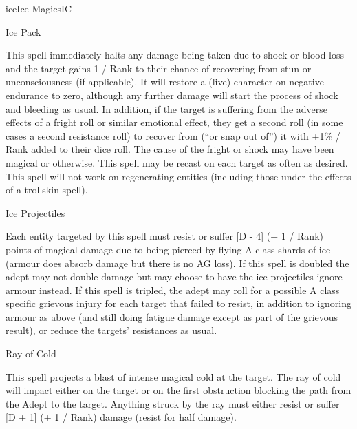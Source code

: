 \begin{college}[1.5]{ice}{Ice Magics}{IC}
\begin{spell}[S-10]{Ice Pack}
\begin{effects}
This spell immediately halts any damage being taken due to shock or
blood loss and the target gains 1 / Rank to their chance of recovering
from stun or unconsciousness (if applicable). It will restore a (live)
character on negative endurance to zero, although any further damage
will start the process of shock and bleeding as usual. In addition, if
the target is suffering from the adverse effects of a fright roll or
similar emotional effect, they get a second roll (in some cases a
second resistance roll) to recover from (``or snap out of'') it with
+1\% / Rank added to their dice roll. The cause of the fright or shock
may have been magical or otherwise. This spell may be recast on each
target as often as desired. This spell will not work on regenerating
entities (including those under the effects of a trollskin spell).
\end{effects}
\end{spell}

\begin{spell}[S-11]{Ice Projectiles}

\begin{effects}
Each entity targeted by this spell must resist or suffer [D - 4] (+ 1
/ Rank) points of magical damage due to being pierced by flying A
class shards of ice (armour does absorb damage but there is no AG
loss). If this spell is doubled the adept may not double damage but
may choose to have the ice projectiles ignore armour instead. If this
spell is tripled, the adept may roll for a possible A class specific
grievous injury for each target that failed to resist, in addition to
ignoring armour as above (and still doing fatigue damage except as
part of the grievous result), or reduce the targets' resistances as
usual.
\end{effects}
\end{spell}

\begin{spell}[S-12]{Ray of Cold}

\begin{effects}
This spell projects a blast of intense magical cold at the target. The
ray of cold will impact either on the target or on the first
obstruction blocking the path from the Adept to the target.  Anything
struck by the ray must either resist or suffer [D + 1] (+ 1 / Rank)
damage (resist for half damage).
\end{effects}
\end{spell}


\end{college}
